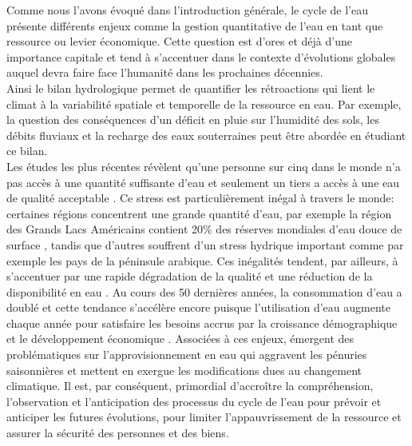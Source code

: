 Comme nous l'avons évoqué dans l'introduction générale, le cycle de l'eau présente différents enjeux comme la gestion quantitative de l'eau en tant que ressource ou levier économique. Cette question est d'ores et déjà d'une importance capitale et tend à s'accentuer dans le contexte d'évolutions globales auquel devra faire face l'humanité dans les prochaines décennies. \\
Ainsi le bilan hydrologique permet de quantifier les rétroactions qui lient le climat à la variabilité spatiale et temporelle de la ressource en eau. Par exemple, la question des conséquences d'un déficit en pluie sur l'humidité des sols, les débits fluviaux et la recharge des eaux souterraines peut être abordée en étudiant ce bilan.\\
Les études les plus récentes révèlent qu'une personne sur cinq  dans le monde n'a pas accès à une quantité suffisante d'eau et seulement un tiers a accès à une eau de qualité acceptable \citep{who2010}. Ce stress est particulièrement inégal à travers le monde: certaines régions concentrent une grande quantité d'eau, par exemple la région des Grands Lacs Américains contient 20\% des réserves mondiales d'eau douce de surface \citep{messager2016}, tandis que d'autres souffrent d'un stress hydrique important comme par exemple les pays de la péninsule arabique. Ces inégalités tendent, par ailleurs, à s'accentuer par une rapide dégradation de la qualité et une réduction de la disponibilité en eau \citep{WDDR2019}. Au cours des 50 dernières années, la consommation d'eau a doublé et cette tendance s'accélère encore puisque l'utilisation d'eau augmente chaque année pour satisfaire les besoins accrus par la croissance démographique et le développement économique \citep{wada2013}. Associées à ces enjeux, émergent des problématiques sur l'approvisionnement en eau qui aggravent les pénuries saisonnières et mettent en exergue les modifications dues au changement climatique. Il est, par conséquent, primordial d'accroître la compréhension, l'observation et l'anticipation des processus du cycle de l'eau pour prévoir et anticiper les futures évolutions, pour limiter l'appauvrissement de la ressource et assurer la sécurité des personnes et des biens.
\\

